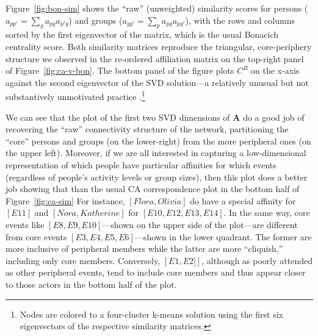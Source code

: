 \documentclass[a4paper,fleqn]{cas-sc}
\begin{document}
Figure~\ref{fig:bon-sim} shows the ``raw'' (unweighted) similarity scores for persons ($a_{pp'} = \sum_g a_{pg}a_{p'g}$) and groups ($a_{gg'} = \sum_p a_{pg}a_{pg'}$), with the rows and columns sorted by the first eigenvector of the matrix, which is the usual Bonacich centrality score. Both similarity matrices reproduce the triangular, core-periphery structure we observed in the re-ordered affiliation matrix on the top-right panel of Figure~\ref{fig:ca-v-bon}. The bottom panel of the figure plots $C^B$ on the x-axis against the second eigenvector of the SVD solution---a relatively unusual but not substantively unmotivated practice \citep{iacobucci2017eigenvector}.\footnote{Nodes are colored to a four-cluster k-means solution using the first six eigenvectors of the respective similarity matrices.} 

We can see that the plot of the first two SVD dimensions of $\mathbf{A}$ do a good job of recovering the ``raw'' connectivity structure of the network, partitioning the ``core'' persons and groups (on the lower-right) from the more peripheral ones (on the upper left). Moreover, if we are all interested in capturing a low-dimensional representation of which people have particular affinities for which events (regardless of people's activity levels or group sizes), then this plot does a better job showing that than the usual CA correspondence plot in the bottom half of Figure~\ref{fig:ca-sim} For instance, $\left[Flora, Olivia\right]$ do have a special affinity for $\left[E11\right]$ and $\left[Nora, Katherine\right]$ for $\left[E10, E12, E13, E14\right]$. In the same way, core events like $\left[E8, E9, E10\right]$---shown on the upper side of the plot---are different from core events $\left[E3, E4, E5, E6\right]$---shown in the lower quadrant. The former are more inclusive of peripheral members while the latter are more ``cliquish,'' including only core members. Conversely, $\left[E1, E2]\right]$, although as poorly attended as other peripheral events, tend to include core members and thus appear closer to those actors in the bottom half of the plot. 
%


\end{document}
